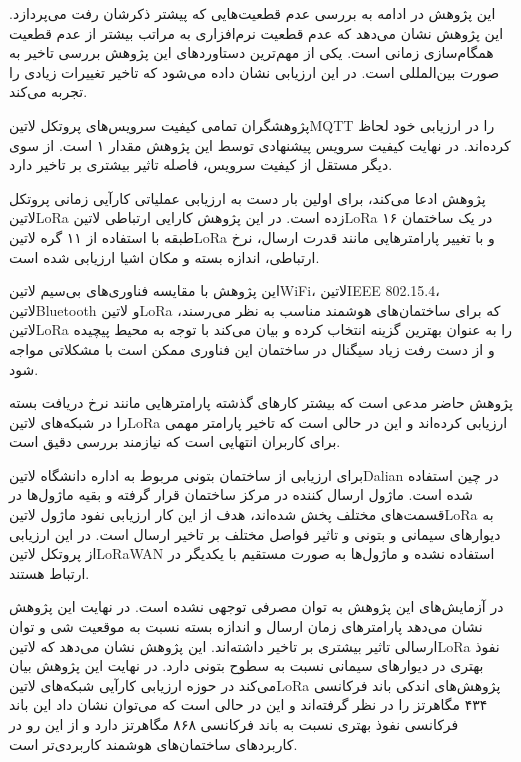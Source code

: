 این پژوهش در ادامه به بررسی عدم قطعیت‌هایی که پیشتر ذکرشان رفت می‌پردازد. این پژوهش نشان می‌دهد که عدم قطعیت نرم‌افزاری به مراتب
بیشتر از عدم قطعیت همگام‌سازی زمانی است. یکی از مهم‌ترین دستاوردهای این پژوهش بررسی تاخیر به صورت بین‌المللی است. در این ارزیابی
نشان داده می‌شود که تاخیر تغییرات زیادی را تجربه می‌کند.

پژوهشگران تمامی کیفیت سرویس‌های پروتکل ‌لاتین{MQTT} را در ارزیابی خود لحاظ کرده‌اند. در نهایت کیفیت سرویس پیشنهادی توسط
این پژوهش مقدار ۱ است. از سوی دیگر مستقل از کیفیت سرویس، فاصله تاثیر بیشتری بر تاخیر دارد.



پژوهش  ادعا می‌کند، برای اولین بار دست به ارزیابی عملیاتی کارآیی زمانی پروتکل ‌لاتین{LoRa} زده است.
در این پژوهش کارایی ارتباطی ‌لاتین{LoRa} در یک ساختمان ۱۶ طبقه با استفاده از ۱۱ گره ‌لاتین{LoRa}
و با تغییر پارامترهایی مانند قدرت ارسال، نرخ ارتباطی، اندازه بسته و مکان اشیا ارزیابی شده است.

این پژوهش با مقایسه فناوری‌های بی‌سیم ‌لاتین{WiFi}، ‌لاتین{IEEE 802.15.4}، ‌لاتین{Bluetooth}
و ‌لاتین{LoRa} که برای ساختمان‌های هوشمند مناسب به نظر می‌رسند، ‌لاتین{LoRa} را به عنوان بهترین گزینه انتخاب کرده
و بیان می‌کند با توجه به محیط پیچیده و از دست رفت زیاد سیگنال در ساختمان این فناوری ممکن است با مشکلاتی مواجه شود.

پژوهش حاضر مدعی است که بیشتر کارهای گذشته پارامترهایی مانند نرخ دریافت بسته را در شبکه‌های ‌لاتین{LoRa} ارزیابی کرده‌اند و این در حالی است
که تاخیر پارامتر مهمی برای کاربران انتهایی است که نیازمند بررسی دقیق است.

برای ارزیابی از ساختمان بتونی مربوط به اداره دانشگاه ‌لاتین{Dalian} در چین استفاده شده است. ماژول ارسال کننده در مرکز ساختمان قرار گرفته و بقیه ماژول‌ها
در قسمت‌های مختلف پخش شده‌اند، هدف از این کار ارزیابی نفود ماژول ‌لاتین{LoRa} به دیوارهای سیمانی و بتونی و تاثیر فواصل مختلف بر تاخیر ارسال است.
در این ارزیابی از پروتکل ‌لاتین{LoRaWAN} استفاده نشده و ماژول‌ها به صورت مستقیم با یکدیگر در ارتباط هستند.

در آزمایش‌های این پژوهش به توان مصرفی توجهی نشده است. در نهایت این پژوهش نشان می‌دهد پارامترهای زمان ارسال و اندازه بسته نسبت به موقعیت شی و توان ارسالی
تاثیر بیشتری بر تاخیر داشته‌اند. این پژوهش نشان می‌دهد که ‌لاتین{LoRa} نفوذ بهتری در دیوارهای سیمانی نسبت به سطوح بتونی دارد.
در نهایت این پژوهش بیان می‌کند در حوزه ارزیابی کارآیی شبکه‌های ‌لاتین{LoRa} پژوهش‌های اندکی باند فرکانسی ۴۳۴ مگاهرتز را در نظر گرفته‌اند و این در حالی است
که می‌توان نشان داد این باند فرکانسی نفوذ بهتری نسبت به باند فرکانسی ۸۶۸ مگاهرتز دارد و از این رو در کاربردهای ساختمان‌های هوشمند کاربردی‌تر است.


